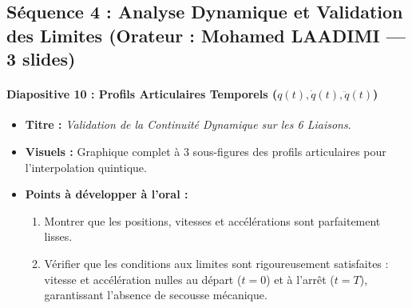 \documentclass[11pt,a4paper]{report}
\begin{document}
\subsection{Séquence 4 : Analyse Dynamique et Validation des Limites (Orateur : Mohamed LAADIMI — 3 slides)}

\paragraph{Diapositive 10 : Profils Articulaires Temporels ($q(t), \dot{q}(t), \ddot{q}(t)$)}
\begin{itemize}
    \item \textbf{Titre :} \textit{Validation de la Continuité Dynamique sur les 6 Liaisons}.
    \item \textbf{Visuels :} Graphique complet à 3 sous-figures des profils articulaires pour l'interpolation quintique.
    \item \textbf{Points à développer à l'oral :}
    \begin{enumerate}
        \item Montrer que les positions, vitesses et accélérations sont parfaitement lisses.
        \item Vérifier que les conditions aux limites sont rigoureusement satisfaites : vitesse et accélération nulles au départ ($t=0$) et à l'arrêt ($t=T$), garantissant l'absence de secousse mécanique.
    \end{enumerate}
\end{itemize}
\end{document}
